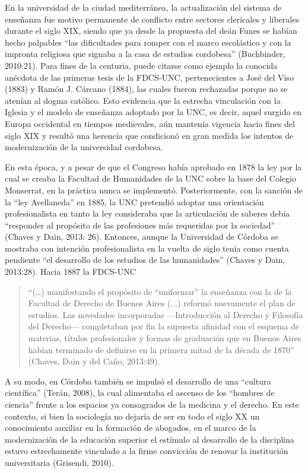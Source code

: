 En la universidad de la ciudad mediterránea, la actualización del sistema de enseñanza fue motivo permanente de conflicto entre sectores clericales y liberales durante el siglo XIX, siendo que ya desde la propuesta del deán Funes se habían hecho palpables ``las dificultades para romper con el marco escolástico y con la impronta religiosa que signaba a la casa de estudios cordobesa'' (Buchbinder, 2010:21). Para fines de la centuria, puede citarse como ejemplo la conocida anécdota de las primeras tesis de la FDCS-UNC, pertenecientes a José del Viso (1883) y Ramón J. Cárcano (1884), las cuales fueron rechazadas porque no se atenían al dogma católico. Esto evidencia que la estrecha vinculación con la Iglesia y el modelo de enseñanza adoptado por la UNC, es decir, aquel surgido en Europa occidental en tiempos medievales, aún mantenía vigencia hacia fines del siglo XIX y resultó una herencia que condicionó en gran medida los intentos de modernización de la universidad cordobesa.

En esta época, y a pesar de que el Congreso había aprobado en 1878 la ley por la cual se creaba la Facultad de Humanidades de la UNC sobre la base del Colegio Monserrat, en la práctica nunca se implementó. Posteriormente, con la sanción de la ``ley Avellaneda'' en 1885, la UNC pretendió adoptar una orientación profesionalista en tanto la ley consideraba que la articulación de saberes debía ``responder al propósito de las profesiones más requeridas por la sociedad'' (Chaves y Dain, 2013: 26). Entonces, aunque la Universidad de Córdoba se mostraba con intención profesionalista en la vuelta de siglo tenía como cuenta pendiente ``el desarrollo de los estudios de las humanidades'' (Chaves y Dain, 2013:28). Hacia 1887 la FDCS-UNC

\begin{quote}
``(\ldots) manifestando el propósito de ``uniformar'' la enseñanza con la de la Facultad de Derecho de Buenos Aires (...) reformó nuevamente el plan de estudios. Las novedades incorporadas ---Introducción al Derecho y Filosofía del Derecho--- completaban por fin la supuesta afinidad con el esquema de materias, títulos profesionales y formas de graduación que en Buenos Aires habían terminado de definirse en la primera mitad de la década de 1870'' (Chaves, Dain y del Caño, 2013:49).
\end{quote}

A su modo, en Córdoba también se impulsó el desarrollo de una ``cultura científica'' (Terán, 2008), la cual alimentaba el ascenso de los ``hombres de ciencia'' frente a los espacios ya consagrados de la medicina y el derecho. En este contexto, si bien la sociología no dejaría de ser en todo el siglo XX un conocimiento auxiliar en la formación de abogados, en el marco de la modernización de la educación superior el estímulo al desarrollo de la disciplina estuvo estrechamente vinculado a la firme convicción de renovar la institución universitaria (Grisendi, 2010).

